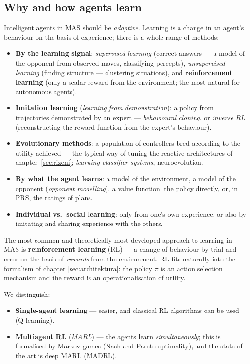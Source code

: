 \documentclass[11pt,a4paper]{article}
\theoremstyle{definition}
\begin{document}
\subsection{Why and how agents learn}

Intelligent agents in MAS should be \emph{adaptive}. Learning is a change in an agent's behaviour on
the basis of experience; there is a whole range of methods:

\begin{defbox}
\begin{itemize}
\item \textbf{By the learning signal}: \emph{supervised learning} (correct answers --- a model
  of the opponent from observed moves, classifying percepts), \emph{unsupervised learning}
  (finding structure --- clustering situations), and \textbf{reinforcement learning} (only a
  scalar reward from the environment; the most natural for autonomous agents).
\item \textbf{Imitation learning} (\emph{learning from demonstration}): a policy from
  trajectories demonstrated by an expert --- \emph{behavioural cloning}, or \emph{inverse RL}
  (reconstructing the reward function from the expert's behaviour).
\item \textbf{Evolutionary methods}: a population of controllers bred according to the utility
  achieved --- the typical way of tuning the reactive architectures of
  chapter~\ref{sec:rizeni}; \emph{learning classifier systems}, neuroevolution.
\item \textbf{By what the agent learns}: a model of the environment, a model of the opponent
  (\emph{opponent modelling}), a value function, the policy directly, or, in PRS, the ratings
  of plans.
\item \textbf{Individual vs.\ social learning}: only from one's own experience, or also by
  imitating and sharing experience with the others.
\end{itemize}
\end{defbox}

The most common and theoretically most developed approach to learning in MAS
is \textbf{reinforcement learning} (RL) --- a change of behaviour by trial and error on the basis of
\emph{rewards} from the environment. RL fits naturally into the formalism of chapter
\ref{sec:architektura}: the policy $\pi$ is an action selection mechanism and the reward
is an operationalisation of utility.

We distinguish:
\begin{itemize}
\item \textbf{Single-agent learning} --- easier, and classical RL algorithms can be used (Q-learning).
\item \textbf{Multiagent RL} (\emph{MARL}) --- the agents learn \emph{simultaneously}; this is
  formalised by Markov games (Nash and Pareto optimality), and the state of the art is deep MARL
  (MADRL).
\end{itemize}
\end{document}
